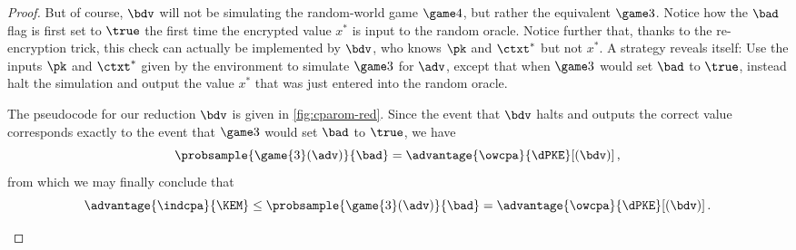 \begin{proof}
      But of course, $\bdv$ will not be simulating the random-world game
        $\game 4$, but rather the equivalent $\game 3$. Notice how the $\bad$
        flag is first set to $\true$ the first time the encrypted value $x^*$
        is input to the random oracle. Notice further that, thanks to the
        re-encryption trick, this check can actually be implemented by $\bdv$,
        who knows $\pk$ and $\ctxt^*$ but not $x^*$. A strategy reveals
        itself: Use the inputs $\pk$ and $\ctxt^*$ given by the \owcpa
        environment to simulate $\game 3$ for $\adv$, except that when $\game
        3$ would set $\bad$ to $\true$, instead halt the simulation and output
        the value $x^*$ that was just entered into the random oracle.

      The pseudocode for our reduction $\bdv$ is given in
        \cref{fig:cparom-red}. Since the event that $\bdv$ halts and outputs
        the correct value corresponds exactly to the event that $\game 3$
        would set $\bad$ to $\true$, we have
      \[
        \probsample{\game{3}(\adv)}{\bad} =
          \advantage{\owcpa}{\dPKE}[(\bdv)]\, ,
      \]
      from which we may finally conclude that
      \[
        \advantage{\indcpa}{\KEM} \leq 
        \probsample{\game{3}(\adv)}{\bad}
        = \advantage{\owcpa}{\dPKE}[(\bdv)]\, . 
      \]

    \begin{figure}[t]
    	\begin{center}
    		\fbox{
    			\small
    			\nicoresetlinenr
    			\begin{minipage}[t]{3.7cm}	
            \underline{\redHeading $\bdv(\pk, \chalctxt)$}
            \smallskip
    				\begin{nicodemus}
              \item $\eK^* \sample \Kspace$
              \smallskip
    					\item $\advbit \gets \adv^{\RO}(\pk, \eK^*, \chalctxt)$
              \smallskip
    					\item $\pcoutput \bot$
    				\end{nicodemus}
    			\end{minipage}
    
}
\end{center}
\end{figure}
\end{proof}
